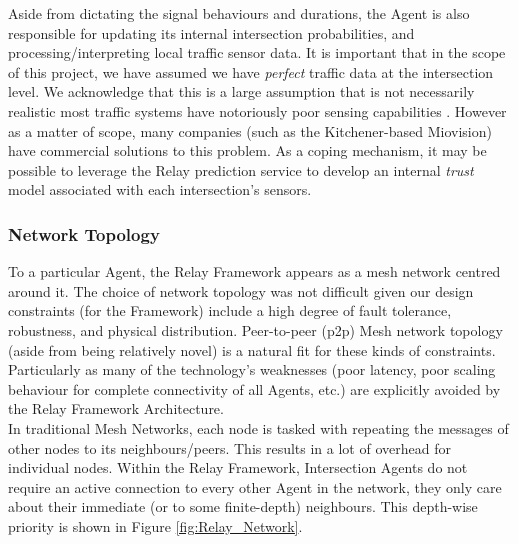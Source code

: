 \documentclass{report}
\begin{document}
Aside from dictating the signal behaviours and durations, the Agent is also responsible for updating its internal intersection probabilities, and processing/interpreting local traffic sensor data.
It is important that in the scope of this project, we have assumed we have \emph{perfect} traffic data at the intersection level.
We acknowledge that this is a large assumption that is not necessarily realistic most traffic systems have notoriously poor sensing capabilities \cite{Miovision:2012}.
However as a matter of scope, many companies (such as the Kitchener-based Miovision) have commercial solutions to this problem.
As a coping mechanism, it may be possible to leverage the Relay prediction service to develop an internal \emph{trust} model associated with each intersection's sensors.\\

\subsubsection{Network Topology}
\label{subsubsec:net-top}

To a particular Agent, the Relay Framework appears as a mesh network centred around it.
The choice of network topology was not difficult given our design constraints (for the Framework) include a high degree of fault tolerance, robustness, and physical distribution.
Peer-to-peer (p2p) Mesh network topology (aside from being relatively novel) is a natural fit for these kinds of constraints.
Particularly as many of the technology's weaknesses (poor latency, poor scaling behaviour for complete connectivity of all Agents, etc.) are explicitly avoided by the Relay Framework Architecture.\\

In traditional Mesh Networks, each node is tasked with repeating the messages of other nodes to its neighbours/peers.
This results in a lot of overhead for individual nodes.
Within the Relay Framework, Intersection Agents do not require an active connection to every other Agent in the network, they only care about their immediate (or to some finite-depth) neighbours.
This depth-wise priority is shown in Figure \ref{fig:Relay_Network}.\\
\end{document}
